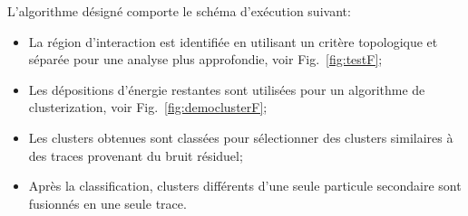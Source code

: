 L'algorithme d\'esign\'e comporte le sch\'ema d'ex\'ecution suivant:
\begin{itemize}
	\item La région d'interaction est identifiée en utilisant un critère topologique et séparée pour une analyse plus approfondie, voir Fig.~\ref{fig:testF};
	\item Les dépositions d'énergie restantes sont utilisées pour un algorithme de clusterization, voir Fig.~\ref{fig:democlusterF};
	\item Les clusters obtenues sont classées pour sélectionner des clusters similaires à des traces provenant du bruit résiduel;
	\item Après la classification, clusters différents d'une seule particule secondaire  sont fusionnés en une seule trace.
	
\end{itemize}
